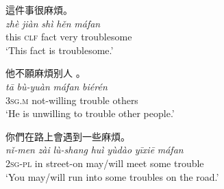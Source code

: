 \documentclass[output=paper]{langsci/langscibook}
\begin{document}
  \ea\label{ex:BascianoMelloni:3a}  這件事很麻煩。\\
  \gll \emph{zhè} \emph{jiàn} \emph{shì} \emph{hěn} \emph{máfan}\\
  this \textsc{clf} fact very troublesome\\
  \glt `This fact is troublesome.'

  \ex\label{ex:BascianoMelloni:3b} 他不願麻煩别人 。\\
  \gll \emph{tā} \emph{bù-yuàn} \emph{máfan} \emph{biérén}\\
  \textsc{3sg.m} not-willing trouble others\\
  \glt `He is unwilling to trouble other people.'

  \ex\label{ex:BascianoMelloni:3c} 你們在路上會遇到一些麻煩。\\
  \gll \emph{nǐ-men} \emph{zài} \emph{lù-shang} \emph{huì} \emph{yùdào} \emph{yīxiē} \emph{máfan}\\
  \textsc{2sg-pl} in street-on may/will meet some trouble\\
  \glt `You may/will run into some troubles on the road.'
  \z
\z
\end{document}

